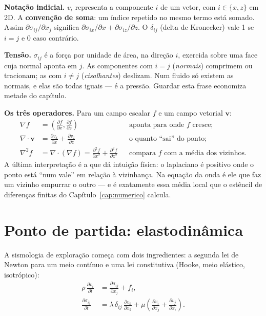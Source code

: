 \documentclass[11pt,a4paper,oneside]{report}
\begin{document}
\begin{matematica}
\textbf{Nota\c{c}\~ao indicial.} $v_i$ representa a componente $i$ de um
vetor, com $i \in \{x,z\}$ em 2D. A \textbf{conven\c{c}\~ao de soma}: um
\'indice repetido no mesmo termo est\'a somado. Assim
$\partial\sigma_{ij}/\partial x_j$ significa
$\partial\sigma_{ix}/\partial x + \partial\sigma_{iz}/\partial z$. O
$\delta_{ij}$ (delta de Kronecker) vale 1 se $i=j$ e 0 caso contr\'ario.

\textbf{Tens\~ao.} $\sigma_{ij}$ \'e a for\c{c}a por unidade de \'area, na
dire\c{c}\~ao $i$, exercida sobre uma face cuja normal aponta em $j$. As
componentes com $i = j$ (\emph{normais}) comprimem ou tracionam; as com
$i \ne j$ (\emph{cisalhantes}) deslizam. Num fluido s\'o existem as normais, e
elas s\~ao todas iguais --- \'e a press\~ao. Guardar esta frase economiza
metade do cap\'itulo.

\textbf{Os tr\^es operadores.} Para um campo escalar $f$ e um campo vetorial
$\mathbf{v}$:
\begin{align*}
\nabla f &= \left(\frac{\partial f}{\partial x},
  \frac{\partial f}{\partial z}\right)
  && \text{aponta para onde $f$ cresce;} \\[2pt]
\nabla\!\cdot\!\mathbf{v} &= \frac{\partial v_x}{\partial x}
  + \frac{\partial v_z}{\partial z}
  && \text{o quanto ``sai'' do ponto;} \\[2pt]
\nabla^{2} f &= \nabla\!\cdot\!(\nabla f)
  = \frac{\partial^{2} f}{\partial x^{2}}
  + \frac{\partial^{2} f}{\partial z^{2}}
  && \text{compara $f$ com a m\'edia dos vizinhos.}
\end{align*}
A \'ultima interpreta\c{c}\~ao \'e a que d\'a intui\c{c}\~ao f\'isica: o
laplaciano \'e positivo onde o ponto est\'a ``num vale'' em rela\c{c}\~ao \`a
vizinhan\c{c}a. Na equa\c{c}\~ao da onda \'e ele que faz um vizinho empurrar o
outro --- e \'e exatamente essa m\'edia local que o est\^encil de
diferen\c{c}as finitas do Cap\'itulo~\ref{cap:numerico} calcula.
\end{matematica}

\section{Ponto de partida: elastodin\^amica}

A sismologia de explora\c{c}\~ao come\c{c}a com dois ingredientes: a segunda
lei de Newton para um meio cont\'inuo e uma lei constitutiva (Hooke, meio
el\'astico, isotr\'opico):
\begin{align}
\rho\,\frac{\partial v_i}{\partial t}
  &= \frac{\partial \sigma_{ij}}{\partial x_j} + f_i ,
  \label{eq:momento}\\[3pt]
\frac{\partial \sigma_{ij}}{\partial t}
  &= \lambda\,\delta_{ij}\,\frac{\partial v_k}{\partial x_k}
   + \mu\left(\frac{\partial v_i}{\partial x_j}
            + \frac{\partial v_j}{\partial x_i}\right).
  \label{eq:hooke}
\end{align}
\end{document}
